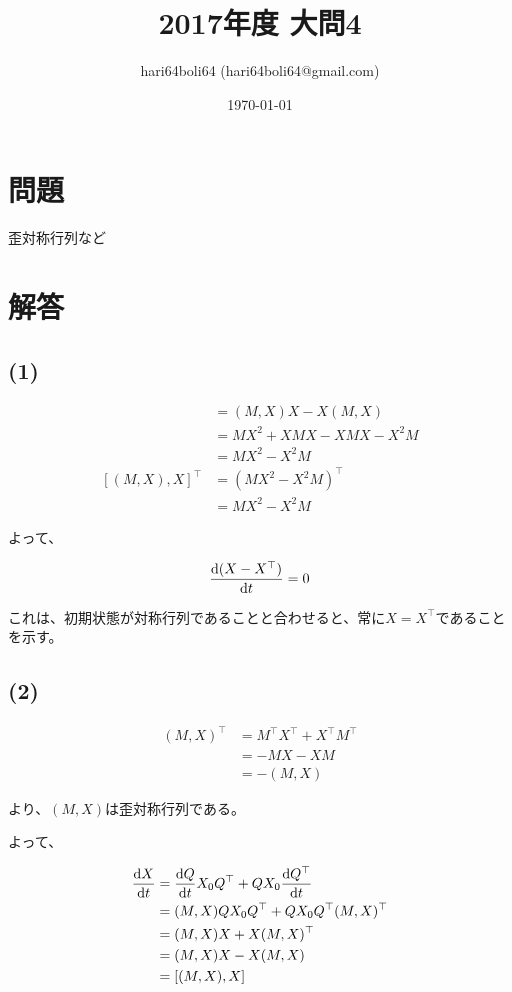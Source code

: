 \documentclass[a4paper, 10pt, dvipdfmx]{jlreq}
\begin{document}
\title{2017年度 大問4}
\author{hari64boli64 (hari64boli64@gmail.com)}
\date{\today}
\maketitle

\section{問題}

歪対称行列など

\section{解答}

\subsection*{(1)}

\begin{align*}
  [(M,X),X]      & =(M,X)X-X(M,X)     \\
                 & =MX^2+XMX-XMX-X^2M \\
                 & =MX^2-X^2M         \\
  [(M,X),X]^\top & =(MX^2-X^2M)^\top  \\
                 & =MX^2-X^2M
\end{align*}

よって、

\begin{equation*}
  \dv{(X-X^\top )}{t}=0
\end{equation*}

これは、初期状態が対称行列であることと合わせると、常に$X=X^\top $であることを示す。

\subsection*{(2)}

\begin{align*}
  (M,X)^\top & =M^\top X^\top +X^\top M^\top \\
             & =-MX-XM                       \\
             & =-(M,X)
\end{align*}

より、$(M,X)$は歪対称行列である。

よって、

\begin{align*}
  \dv{X}{t} & =\dv{Q}{t}X_0Q^\top +QX_0\dv{Q^\top }{t} \\
            & =(M,X)QX_0Q^\top +QX_0Q^\top (M,X)^\top  \\
            & =(M,X)X+X(M,X)^\top                      \\
            & =(M,X)X-X(M,X)                           \\
            & =[(M,X),X]
\end{align*}
\end{document}
